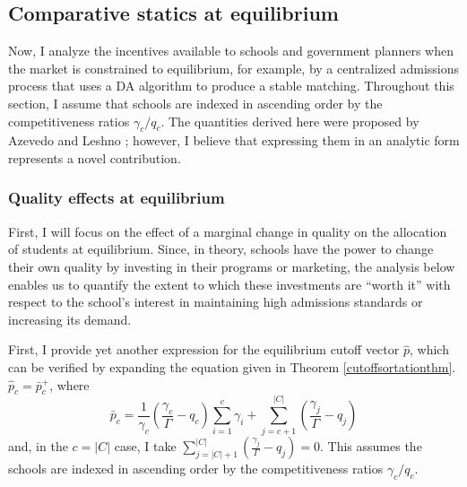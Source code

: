 \documentclass[12pt]{article}
\theoremstyle{definition}
\begin{document}
\subsection{Comparative statics at equilibrium} \label{compstateq}
Now, I analyze the incentives available to schools and government planners when the market is constrained to equilibrium, for example, by a centralized admissions process that uses a DA algorithm to produce a stable matching. Throughout this section, I assume that schools are indexed in ascending order by the competitiveness ratios $\gamma_c / q_c$. The quantities derived here were proposed by Azevedo and Leshno \parencite*{supplydemandfw}; however, I believe that expressing them in an analytic form represents a novel contribution. 

\subsubsection{Quality effects at equilibrium} \label{qualityeffectsateq}
First, I will focus on the effect of a marginal change in quality on the allocation of students at equilibrium. Since, in theory, schools have the power to change their own quality by investing in their programs or marketing, the analysis below enables us to quantify the extent to which these investments are ``worth it'' with respect to the school's interest in maintaining high admissions standards or increasing its demand. 

First, I provide yet another expression for the equilibrium cutoff vector $\hat p$, which can be verified by expanding the equation given in Theorem \ref{cutoffsortationthm}. $\hat p_c = \bar p_c^+$, where
\begin{equation} \label{yetanothereqcutoff}
\bar p_c = 
\frac{1}{\gamma_c} \left(\frac{\gamma_c}{\Gamma} - q_c\right) \sum_{i=1}^{c} \gamma_i 
+ \sum_{j=c+1}^{|C|} \left( \frac{\gamma_j}{\Gamma} - q_j \right)
\end{equation}
and, in the $c = |C|$ case, I take $\sum_{j=|C|+1}^{|C|} \left( \frac{\gamma_j}{\Gamma} - q_j \right)= 0$. This assumes the schools are indexed in ascending order by the competitiveness ratios $\gamma_c / q_c$. 
\end{document}
